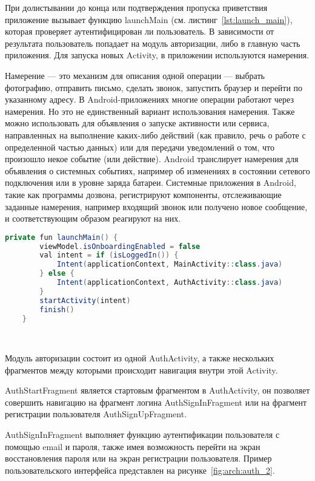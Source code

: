 При долистывании до конца или подтверждения пропуска приветствия приложение вызывает функцию launchMain (см. листинг~\ref{lst:launch_main}), которая проверяет аутентифицирован ли пользователь. В зависимости от результата пользователь попадает на модуль авторизации, либо в главную часть приложения. Для запуска новых Activity, в приложении используются намерения.

Намерение — это механизм для описания одной операции — выбрать фотографию, отправить письмо, сделать звонок, запустить браузер и перейти по указанному адресу. В Android-приложениях многие операции работают через намерения. Но это не единственный вариант использования намерения. Также можно использовать для объявления о запуске активности или сервиса, направленных на выполнение каких-либо действий (как правило, речь о работе с определенной частью данных) или для передачи уведомлений о том, что произошло некое событие (или действие). Android транслирует намерения для объявления о системных событиях, например об изменениях в состоянии сетевого подключения или в уровне заряда батареи. Системные приложения в Android, такие как программы дозвона, регистрируют компоненты, отслеживающие заданные намерения, например входящий звонок или получено новое сообщение, и соответствующим образом реагируют на них.

\begin{lstlisting}[language=Java,label={lst:launch_main},caption={Функция launchMain}]
    private fun launchMain() {
        viewModel.isOnboardingEnabled = false
        val intent = if (isLoggedIn()) {
            Intent(applicationContext, MainActivity::class.java)
        } else {
            Intent(applicationContext, AuthActivity::class.java)
        }
        startActivity(intent)
        finish()
    }
\end{lstlisting}


~\par

Модуль авторизации состоит из одной AuthActivity, а также нескольких фрагментов между которыми происходит навигация внутри этой Activity.

AuthStartFragment является стартовым фрагментом в AuthActivity, он позволяет совершить навигацию на фрагмент логина AuthSignInFragment или на фрагмент регистрации пользователя AuthSignUpFragment.

AuthSignInFragment выполняет функцию аутентификации пользователя с помощью email и пароля, также имея возможность перейти на экран восстановления пароля или на экран регистрации пользователя. Пример пользовательского интерфейса представлен на рисунке~\ref{fig:arch:auth_2}.

